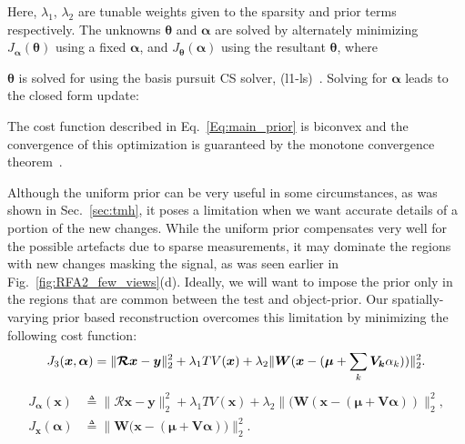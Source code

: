 \documentclass[journal]{IEEEtran}
\def\x{{\mathbf x}}
\begin{document}
Here, $\lambda_1$, $\lambda_2$ are tunable weights given to the sparsity and prior terms respectively. The unknowns $\boldsymbol{\theta}$ and $\boldsymbol{\alpha}$
are solved by alternately minimizing $J_{\boldsymbol{\alpha}}(\boldsymbol{\theta})$ using a fixed $\boldsymbol{\alpha}$, and $J_{\boldsymbol\theta}(\boldsymbol{\alpha})$ using the resultant $\boldsymbol{\theta}$, where 

$\boldsymbol{\theta}$ is solved for using the basis pursuit CS solver, (l1-ls)~\cite{l1ls}. Solving for $\boldsymbol{\alpha}$ leads to the closed form update:

The cost function described in Eq.~\ref{Eq:main_prior} is biconvex and the convergence of this optimization is guaranteed by the monotone convergence theorem~\cite{monotone}.
 \vspace{2mm}



Although the uniform prior can be very useful in some
circumstances, as was shown in Sec.~\ref{sec:tmh}, it poses a 
limitation when we want accurate details of a portion of the new changes. While the
uniform prior compensates very well for the possible artefacts due to
sparse measurements, it may dominate the regions with new changes masking
the signal, as was seen earlier in Fig.~\ref{fig:RFA2_few_views}(d). Ideally, we
will want to impose the prior only in the regions that are common
between the test and object-prior.  Our spatially-varying prior based
reconstruction overcomes this limitation by minimizing the following
cost function:
\begin{equation}
J_3(\boldsymbol{x},\boldsymbol{\alpha}) = \lVert\boldsymbol{\mathcal{R} x}-\boldsymbol{y}\rVert_2^2  + \lambda_1TV(\boldsymbol{x}) +\\ \lambda_2\lVert\boldsymbol{W}(\boldsymbol{x} - (\boldsymbol{\mu} + \sum_{k}\boldsymbol{V_k}\alpha_k))\rVert_2^2.
\label{eq:spatially-varying_prior}
\end{equation}
\begin{align}
J_{\boldsymbol{\alpha}}(\boldsymbol{\x}) &\triangleq \lVert\boldsymbol{\mathcal{R} x- y}\rVert_2^2  + \lambda_1TV(\boldsymbol{x}) +\lambda_2\lVert(\boldsymbol{W}(\boldsymbol{x} - (\boldsymbol{\mu + V\alpha}))\rVert_2^2, \\
J_{\boldsymbol{x}}(\boldsymbol{\alpha}) &\triangleq \lVert\boldsymbol{\boldsymbol{W}(\boldsymbol{x}} - (\boldsymbol{\mu + V\alpha}))\rVert_2^2.
\end{align}
\end{document}
